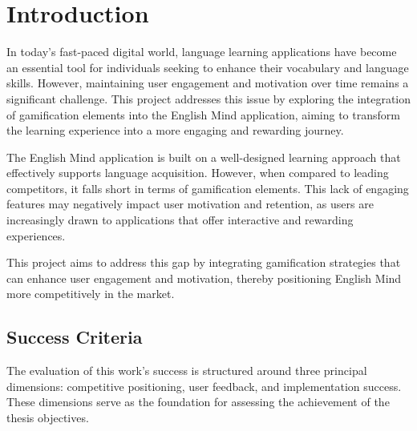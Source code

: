 \chapter{Introduction}

In today's fast-paced digital world, language learning applications have become an essential tool for individuals seeking to enhance their vocabulary and language skills. However, maintaining user engagement and motivation over time remains a significant challenge. This project addresses this issue by exploring the integration of gamification elements into the English Mind application, aiming to transform the learning experience into a more engaging and rewarding journey.

The English Mind application is built on a well-designed learning approach that effectively supports language acquisition. However, when compared to leading competitors, it falls short in terms of gamification elements. This lack of engaging features may negatively impact user motivation and retention, as users are increasingly drawn to applications that offer interactive and rewarding experiences. 

This project aims to address this gap by integrating gamification strategies that can enhance user engagement and motivation, thereby positioning English Mind more competitively in the market.

\newpage

\section{Success Criteria}

The evaluation of this work's success is structured around three principal dimensions: competitive positioning, user feedback, and implementation success. These dimensions serve as the foundation for assessing the achievement of the thesis objectives.

